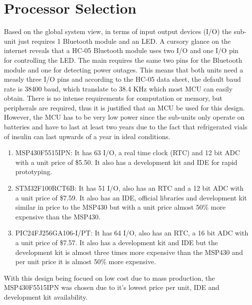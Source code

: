 \section{Processor Selection}
Based on the global system view, in terms of input output devices (I/O) the sub-unit just requires 1 Bluetooth module and an LED. A cursory glance on the internet reveals that a HC-05 Bluetooth module\cite{InterfacingHC05Bluetooth} uses two I/O and one I/O pin for controlling the LED. The main requires the same two pins for the Bluetooth module and one for detecting power outages. This means that both units need a measly three I/O pins and according to the HC-05 data sheet, the default baud rate is 38400 baud, which translate to 38.4 KHz which most MCU can easily obtain. There is no intense requirements for computation or memory, but peripherals are required, thus it is justified that an MCU be used for this design. However, the MCU has to be very low power since the sub-units only operate on batteries and have to last at least two years due to the fact that refrigerated vials of insulin can last upwards of a year in ideal conditions.
\begin{enumerate}
  \item MSP430F5515IPN: It has 63 I/O, a real time clock (RTC) and 12 bit ADC with a unit price of \$5.50. It also has a development kit and IDE for rapid prototyping.
  \item STM32F100RCT6B: It has 51 I/O, also has an RTC and a 12 bit ADC with a unit price of \$7.59. It also has an IDE, official libraries and development kit similar in price to the MSP430 but with a unit price almost 50\% more expensive than the MSP430.
  \item PIC24FJ256GA106-I/PT: It has 64 I/O, also has an RTC, a 16 bit ADC with a unit price of \$7.57. It also has a development kit and IDE but the development kit is almost three times more expensive than the MSP430 and per unit price it is almost 50\% more expensive.
\end{enumerate}
With this design being focued on low cost due to mass production, the MSP430F5515IPN was chosen due to it's lowest price per unit, IDE and development kit availability.
